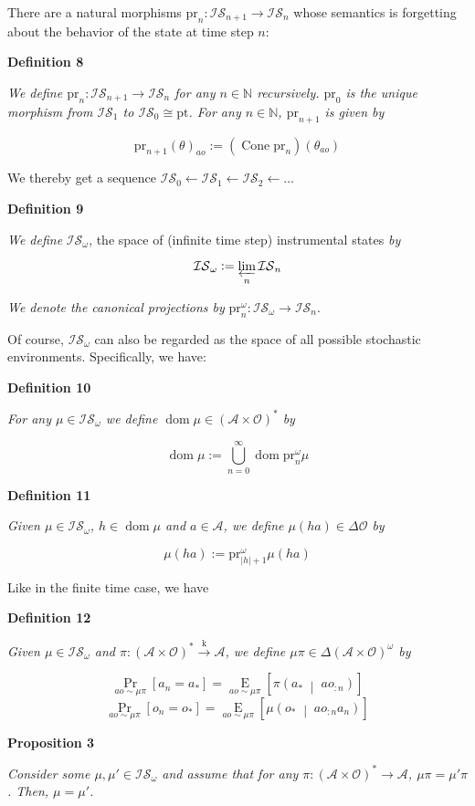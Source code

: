 \documentclass[a4paper]{article}
\newcommand{\Co}[1]{}
\DeclareMathOperator{\Dom}{dom}
\newcommand{\AP}[1]{\left(#1\right)}
\newcommand{\AB}[1]{\left[#1\right]}
\newcommand{\APM}[2]{\left(#1\;\middle\vert\;#2\right)}
\newcommand{\Abs}[1]{\left\vert #1 \right\vert}
\newcommand{\Pa}[2]{\underset{#1}{\operatorname{Pr}}\AB{#2}}
\newcommand{\Ea}[2]{\underset{#1}{\operatorname{E}}\AB{#2}}
\newcommand{\Nats}{\mathbb{N}}
\newcommand{\Pt}{\boldsymbol{\mathrm{pt}}}
\newcommand{\K}{\xrightarrow{\mathrm{k}}}
\newcommand{\A}{\mathcal{A}}
\newcommand{\Ob}{\mathcal{O}}
\newcommand{\AO}{\AP{\A\times\Ob}}
\newcommand{\FH}{\AO^*}
\DeclareMathOperator{\Cone}{Cone}
\newcommand{\IS}{\mathcal{IS}}
\newcommand{\Prj}{\mathrm{pr}}
\newcommand{\Prjo}{\mathrm{pr}^\omega_n}
\begin{document}
There are a natural morphisms $\Prj_n:\IS_{n+1}\rightarrow\IS_n$ whose semantics is forgetting about the behavior of the state at time step $n$:

\textbf{Definition 8}\Co{b}

\textit{We define $\Prj_n:\IS_{n+1}\rightarrow\IS_n$ for any $n\in\Nats$ recursively. $\Prj_0$ is the unique morphism from $\IS_1$ to $\IS_0\cong\Pt$. For any $n\in\Nats$, $\Prj_{n+1}$ is given by}\Co{i}

$$\Prj_{n+1}(\theta)_{ao}:=\AP{\Cone{\Prj_n}}\AP{\theta_{ao}}$$

We thereby get a sequence $\IS_0 \leftarrow \IS_1 \leftarrow \IS_2 \leftarrow \ldots$

\textbf{Definition 9}\Co{b}

\textit{We define}\Co{i} $\IS_\omega$, the space of (infinite time step) instrumental states \textit{by}\Co{i}

$$\IS_\omega:=\varprojlim_n \IS_n$$

\textit{We denote the canonical projections by}\Co{i} $\Prjo:\IS_\omega\rightarrow\IS_n$.

Of course, $\IS_\omega$ can also be regarded as the space of all possible stochastic environments. Specifically, we have:

\textbf{Definition 10}\Co{b}

\textit{For any $\mu\in\IS_\omega$ we define $\Dom\mu\in\FH$ by}\Co{i}

$$\Dom\mu:=\bigcup_{n=0}^\infty \Dom\Prjo\mu$$

\textbf{Definition 11}\Co{b}

\textit{Given $\mu\in\IS_\omega$, $h\in\Dom\mu$ and $a\in\A$, we define $\mu(ha)\in\Delta\Ob$ by}\Co{i}

$$\mu(ha):=\Prj^\omega_{\Abs{h}+1}\mu(ha)$$

Like in the finite time case, we have

\textbf{Definition 12}\Co{b}

\textit{Given $\mu\in\IS_\omega$ and $\pi:\FH\K\A$, we define $\mu\pi\in\Delta\AO^\omega$ by}\Co{i}

$$\Pa{ao\sim\mu\pi}{a_n=a_*}=\Ea{ao\sim\mu\pi}{\pi\APM{a_*}{ao_{:n}}}$$
$$\Pa{ao\sim\mu\pi}{o_n=o_*}=\Ea{ao\sim\mu\pi}{\mu\APM{o_*}{ao_{:n}a_n}}$$

\textbf{Proposition 3}\Co{b}

\textit{Consider some $\mu,\mu'\in\IS_\omega$ and assume that for any $\pi:\FH\rightarrow\A$, $\mu\pi=\mu'\pi$. Then, $\mu=\mu'$.}\Co{i}
\end{document}
